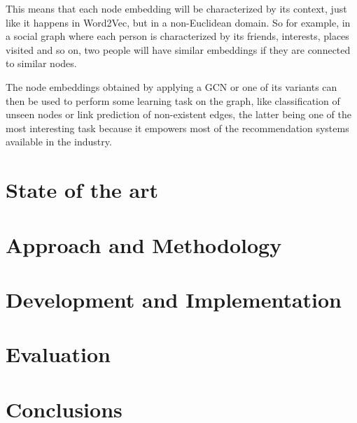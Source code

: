 \documentclass[%
    corpo=13.5pt,
    twoside,
    oldstyle,
    tipotesi=magistrale,
    greek,
    evenboxes
]{toptesi}
\begin{document}
This means that each node embedding will be characterized by its context,
just like it happens in Word2Vec, but in a non-Euclidean domain.
So for example, in a social graph where each person is characterized by its
friends, interests, places visited and so on, two people will have similar
embeddings if they are connected to similar nodes.

The node embeddings obtained by applying a GCN or one of its variants can
then be used to perform some learning task on the graph, like classification
of unseen nodes or link prediction of non-existent edges, the latter being
one of the most interesting task because it empowers most of the
recommendation systems available in the industry.



\chapter{State of the art}

\chapter{Approach and Methodology}

\chapter{Development and Implementation}

\chapter{Evaluation}

\chapter{Conclusions}




\end{document}
